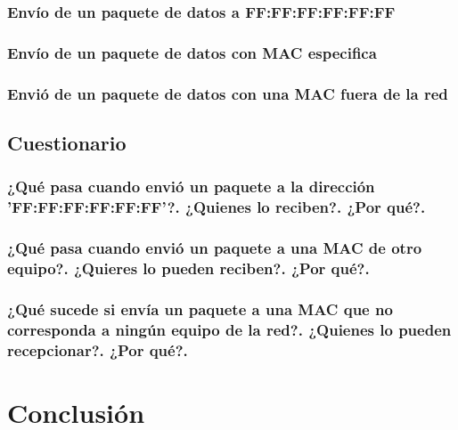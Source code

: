 \documentclass[spanish]{udpreport}
\begin{document}
\subsection{Envío de un paquete de datos a FF:FF:FF:FF:FF:FF}

\subsection{Envío de un paquete de datos con MAC especifica}

\subsection{Envió de un paquete de datos con una MAC fuera de la red}

\newpage

\section{Cuestionario}

\subsection{¿Qué pasa cuando envió un paquete a la dirección 'FF:FF:FF:FF:FF:FF'?. ¿Quienes lo reciben?. ¿Por qué?.}

\subsection{¿Qué pasa cuando envió un paquete a una MAC de otro equipo?. ¿Quieres lo pueden reciben?. ¿Por qué?.}

\subsection{¿Qué sucede si envía un paquete a una MAC que no corresponda a ningún equipo de la red?. ¿Quienes lo pueden recepcionar?. ¿Por qué?.}

\chapter{Conclusión}

\end{document}
